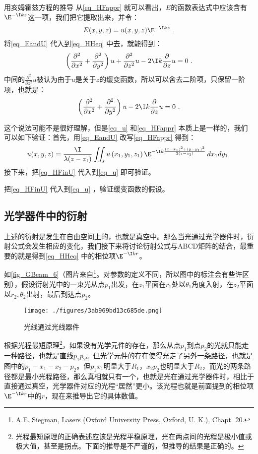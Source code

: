 \begin{example}{用亥姆霍兹方程的推导}
从\autoref{eq_HFappr} 就可以看出，$E$的函数表达式中应该含有$\E^{-\I kz}$这一项，我们把它提取出来，并令：
\begin{equation}\label{eq_EandU}
E(x,y,z)=u(x,y,z)\E^{-\I kz}~.
\end{equation}
将\autoref{eq_EandU} 代入到\autoref{eq_HHeq} 中去，就能得到：
\begin{equation}
\left(\frac{\partial^2}{\partial x^2}+\frac{\partial^2}{\partial y^2}\right)u+\frac{\partial^2}{\partial z^2}u-2\I k\frac{\partial}{\partial z}u=0~.
\end{equation}
中间的$\frac{\partial^2}{\partial z^2}u$被认为由于$u$是关于$z$的缓变函数，所以可以舍去二阶项，只保留一阶项，也就是：
\begin{equation}\label{eq_u}
\left(\frac{\partial^2}{\partial x^2}+\frac{\partial^2}{\partial y^2}\right)u-2\I k\frac{\partial}{\partial z}u=0~.
\end{equation}

这个说法可能不是很好理解，但是\autoref{eq_u} 和\autoref{eq_HFappr} 本质上是一样的，我们可以如下验证：首先，用\autoref{eq_EandU} 改写\autoref{eq_HFappr} 得到：
\begin{equation}\label{eq_HFinU}
u(x,y,z)=\frac{\I}{\lambda(z-z_1)}\iint_s u\left(x_1,y_1,z_1\right)\E^{-\I k\frac{(x-x_1)^2+(y-y_1)^2}{2(z-z_1)}}\,dx_1dy_1~
\end{equation}
接下来，把\autoref{eq_HFinU} 代入到\autoref{eq_u} 即可验证。
\end{example}
\begin{exercise}{}
把\autoref{eq_HFinU} 代入到\autoref{eq_u} ，验证缓变函数的假设。
\end{exercise}

\subsection{光学器件中的衍射}
上述的衍射是发生在自由空间上的，也就是真空中。那么当光通过光学器件时，衍射公式会发生相应的变化，我们接下来将讨论衍射公式与ABCD矩阵的结合，最重要的就是得到\autoref{eq_HHeq} 中的相位项$\E^{-\I kr}$。

如\autoref{fig_GBeam_6}（图片来自\footnote{A.E. Siegman, Lasers (Oxford University Press, Oxford, U. K.), Chapt. 20.}。对参数的定义不同，所以图中的标注会有些许区别），假设衍射光中的一束光从点$p_1$出发，在$z_1$平面在$r_1$处以$\theta_1$角度入射，在$z_2$平面以$r_2,\theta_2$出射，最后到达点$p_2$。
\begin{figure}[ht]
\centering
\texttt{[image: ./figures/3ab969bd13c685de.png]}
\caption{光线通过光线器件} \label{fig_GBeam_6}
\end{figure}
根据光程最短原理\footnote{光程最短原理的正确表述应该是光程平稳原理，光在两点间的光程是极小值或极大值，甚至是拐点。下面的推导是不严谨的，但推导的结果是正确的。}，如果没有光学元件的存在，那么从点$p_1$到点$p_2$的光就只能走一种路径，也就是直线$p_1p_2$。但光学元件的存在使得光走了另外一条路径，也就是图中的$p_1-x_1-x_2-p_2$。但$p_1x_1$明显大于$R_1$，$x_2p_2$也明显大于$R_2$，而光的两条路径都是最小光程路径，那么真相就只有一个，也就是光在通过光学器件时，相比于直接通过真空，光学器件对应的光程“居然”更小。该光程也就是前面提到的相位项$\E^{-\I kr}$中的$r$，现在来推导出它的具体数值。

